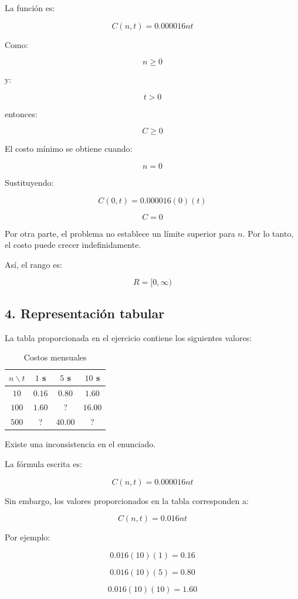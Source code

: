 \documentclass[12pt,a4paper]{article}
\begin{document}
La función es:

\[C(n,t)=0.000016nt\]

Como:

\[n\geq0\]

y:

\[t>0\]

entonces:

\[C\geq0\]

El costo mínimo se obtiene cuando:

\[n=0\]

Sustituyendo:

\[C(0,t)=0.000016(0)(t)\]

\[C=0\]

Por otra parte, el problema no establece un límite superior para $n$.
Por lo tanto, el costo puede crecer indefinidamente.

Así, el rango es:

\[\boxed{R=[0,\infty)}\]


\subsection{4. Representación tabular}

La tabla proporcionada en el ejercicio contiene los siguientes valores:

\begin{table}[H]
\centering
\caption{Costos mensuales}
\begin{tabular}{c|ccc}
\toprule
$n\backslash t$ & $1$ s & $5$ s & $10$ s\\
\midrule
$10$  & $0.16$ & $0.80$ & $1.60$\\
$100$ & $1.60$ & ? & $16.00$\\
$500$ & ? & $40.00$ & ?\\
\bottomrule
\end{tabular}
\end{table}

Existe una inconsistencia en el enunciado.

La fórmula escrita es:

\[C(n,t)=0.000016nt\]

Sin embargo, los valores proporcionados en la tabla corresponden a:

\[\boxed{C(n,t)=0.016nt}\]

Por ejemplo:

\[0.016(10)(1)=0.16\]

\[0.016(10)(5)=0.80\]

\[0.016(10)(10)=1.60\]
\end{document}
